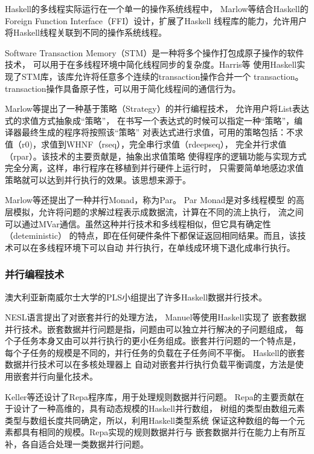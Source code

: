 Haskell的多线程实际运行在一个单一的操作系统线程中，
Marlow等结合Haskell的Foreign Function Interface（FFI）设计，扩展了Haskell
线程库的能力，允许用户将Haskell线程关联到不同的操作系统线程。

Software Transaction Memory（STM）是一种将多个操作打包成原子操作的软件技术，
可以用于在多线程环境中简化线程同步的复杂度。Harris等
使用Haskell实现了STM库，该库允许将任意多个连续的transaction操作合并一个
transaction。transaction操作具备原子性，可以用于简化线程间的通信行为。

Marlow等提出了一种基于策略（Strategy）的并行编程技术，
允许用户将List表达式的求值方式抽象成“策略”，
在书写一个表达式的时候可以指定一种“策略”，编译器最终生成的程序将按照该“策略”
对表达式进行求值，可用的策略包括：不求值（r0)，求值到WHNF（rseq），完全串行求值（rdeepseq），
完全并行求值（rpar）。该技术的主要贡献是，抽象出求值策略
使得程序的逻辑功能与实现方式完全分离，这样，串行程序在移植到并行硬件上运行时，
只需要简单地感边求值策略就可以达到并行执行的效果。该思想来源于。

Marlow等还提出了一种并行Monad，称为Par。
Par Monad是对多线程模型
的高层模拟，允许将问题的求解过程表示成数据流，计算在不同的流上执行，
流之间可以通过MVar通信。虽然这种并行技术和多线程相似，但它具有确定性（deteministic）
的特点，即在任何硬件条件下都保证返回相同结果。而且，该技术可以在多线程环境下可以自动
并行执行，在单线成环境下退化成串行执行。

\subsubsection{并行编程技术}
澳大利亚新南威尔士大学的PLS小组提出了许多Haskell数据并行技术。

NESL语言提出了对嵌套并行的处理方法，
Manuel等使用Haskell实现了
嵌套数据并行技术。嵌套数据并行问题是指，问题由可以独立并行解决的子问题组成，
每个子任务本身又由可以并行执行的更小任务组成。嵌套并行问题的一个特点是，
每个子任务的规模是不同的，并行任务的负载在子任务间不平衡。
Haskell的嵌套数据并行技术可以在多核处理器上
自动对嵌套并行执行负载平衡调度，方法是使用嵌套并行向量化技术。

Keller等还设计了Repa程序库，用于处理规则数据并行问题。
Repa的主要贡献在于设计了一种高维的，具有动态规模的Haskell并行数组，
树组的类型由数组元素类型与数组长度共同确定，所以，利用Haskell类型系统
保证这种数组的每一个元素都具有相同的规模。Repa实现的规则数据并行与
嵌套数据并行在能力上有所互补，各自适合处理一类数据并行问题。

